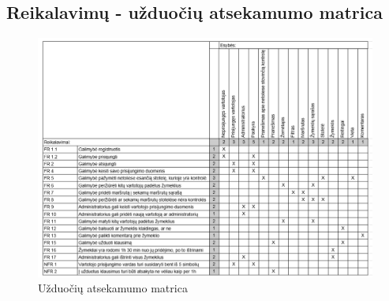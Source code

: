\documentclass{VUMIFPSkursinis}
\begin{document}
\subsection{Reikalavimų - užduočių atsekamumo matrica}
	\begin{figure}[H]
				\centering
				\includegraphics[scale=0.4]{img/uzduociu_matrica}
				\caption{Užduočių atsekamumo matrica}
				\label{img:matrix}
			\end{figure}
\end{document}
